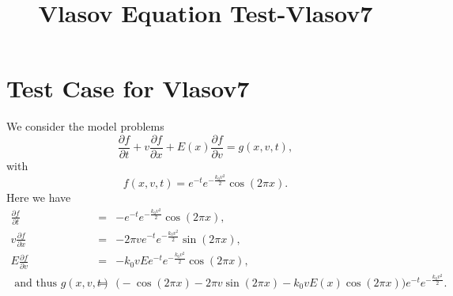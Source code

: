 \documentclass[a4paper,10pt]{article}
\title{Vlasov Equation Test-Vlasov7}
\author{}
\date{}
\numberwithin{equation}{section}
\begin{document}
\maketitle


\section{Test Case for Vlasov7}
We consider the model problems
\begin{equation}
\frac{\partial f}{\partial t}+v\frac{\partial f}{\partial x}+E(x)\frac{\partial f}{\partial v}=g(x,v,t),
\end{equation}
with 
$$f(x,v,t)=e^{-t}e^{-\frac{k_0v^2}{2}}\cos(2\pi x).$$
Here we have
\begin{eqnarray}
\frac{\partial f}{\partial t}&=&-e^{-t}e^{-\frac{k_0v^2}{2}}\cos(2\pi x),\\
v\frac{\partial f}{\partial x}&=&-2\pi v e^{-t}e^{-\frac{k_0v^2}{2}}\sin(2\pi x),\\
E\frac{\partial f}{\partial v}&=& -k_0 v Ee^{-t}e^{-\frac{k_0v^2}{2}}\cos(2\pi x),\\
\mbox{ and thus } g(x,v,t)&=& \bigg(-\cos(2\pi x)-2\pi v \sin(2\pi x)-k_0 v E(x)\cos(2\pi x)\bigg)e^{-t}e^{-\frac{k_0v^2}{2}}.
\end{eqnarray}
\end{document}
